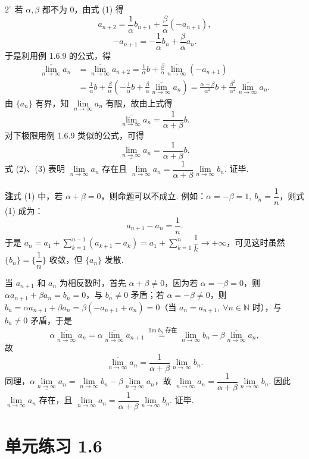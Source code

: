 \documentclass[UTF8,12pt,a4paper,fontset=fandol]{ctexart}
\begin{document}
$2^\circ$ 若 $\alpha,\beta$ 都不为 0，由式 (1) 得
\[
  a_{n+2}=\frac1{\alpha}b_{n+1}+\frac{\beta}{\alpha}(-a_{n+1}),
\]
\[
  -a_{n+1}=-\frac1{\alpha}b_n+\frac{\beta}{\alpha}a_n.
\]
于是利用例 1.6.9 的公式，得
\[
\begin{aligned}
  \overline{\lim_{n\to\infty}}a_n
  &=\overline{\lim_{n\to\infty}}a_{n+2}
   =\frac1{\alpha}b+\frac{\beta}{\alpha}\overline{\lim_{n\to\infty}}(-a_{n+1})\\
  &=\frac1{\alpha}b+\frac{\beta}{\alpha}\left(-\frac1{\alpha}b+\frac{\beta}{\alpha}\overline{\lim_{n\to\infty}}a_n\right)
   =\frac{\alpha-\beta}{\alpha^2}b+\frac{\beta^2}{\alpha^2}\overline{\lim_{n\to\infty}}a_n.
\end{aligned}
\]
由 $\{a_n\}$ 有界，知 $\overline{\lim\limits_{n\to\infty}}a_n$ 有限，故由上式得
\[
  \overline{\lim_{n\to\infty}}a_n=\frac1{\alpha+\beta}b.
\tag{2}
\]
对下极限用例 1.6.9 类似的公式，可得
\[
  \underline{\lim_{n\to\infty}}a_n=\frac1{\alpha+\beta}b.
\tag{3}
\]
式 (2)、(3) 表明 $\lim\limits_{n\to\infty}a_n$ 存在且 $\lim\limits_{n\to\infty}a_n=\dfrac1{\alpha+\beta}\lim\limits_{n\to\infty}b_n$. 证毕.

\noindent\textbf{注}\quad 式 (1) 中，若 $\alpha+\beta=0$，则命题可以不成立. 例如：$\alpha=-\beta=1,\ b_n=\dfrac1n$，则式 (1) 成为：
\[
  a_{n+1}-a_n=\frac1n.
\]
于是 $a_n=a_1+\sum\limits_{k=1}^{n-1}(a_{k+1}-a_k)=a_1+\sum\limits_{k=1}^{n}\dfrac1k\to+\infty$，可见这时虽然 $\{b_n\}=\{\dfrac1n\}$ 收敛，但 $\{a_n\}$ 发散.

当 $a_{n+1}$ 和 $a_n$ 为相反数时，首先 $\alpha+\beta\ne0$，因为若 $\alpha=-\beta=0$，则 $\alpha a_{n+1}+\beta a_n=b_n=0$，与 $b_n\ne0$ 矛盾；若 $\alpha=-\beta\ne0$，则 $b_n=\alpha a_{n+1}+\beta a_n=\beta(-a_{n+1}+a_n)=0$（当 $a_n=a_{n+1},\ \forall n\in\mathbb{N}$ 时），与 $b_n\ne0$ 矛盾，于是
\[
  \alpha\overline{\lim_{n\to\infty}}a_n
  =\alpha\overline{\lim_{n\to\infty}}a_{n+1}
  \overset{\lim b_n\text{ 存在}}{=}
  \lim_{n\to\infty}b_n-\beta\overline{\lim_{n\to\infty}}a_n,
\]
故
\[
  \overline{\lim_{n\to\infty}}a_n=\frac1{\alpha+\beta}\lim_{n\to\infty}b_n.
\]
同理，$\alpha\underline{\lim\limits_{n\to\infty}}a_n
=\lim\limits_{n\to\infty}b_n-\beta\underline{\lim\limits_{n\to\infty}}a_n$，故 $\lim\limits_{n\to\infty}a_n=\dfrac1{\alpha+\beta}\lim\limits_{n\to\infty}b_n$. 因此 $\lim\limits_{n\to\infty}a_n$ 存在，且 $\lim\limits_{n\to\infty}a_n=\dfrac1{\alpha+\beta}\lim\limits_{n\to\infty}b_n$. 证毕.

\section*{单元练习 1.6}
\end{document}
